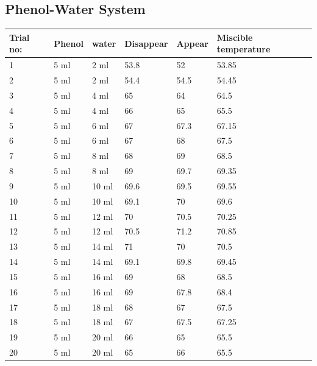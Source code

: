 \documentclass{report}
\begin{document}
 \subsection*{Phenol-Water System}
\begin{table}[H] 
    \centering
\begin{tabular}{|l|l|l|l|l|l|}
\hline
Trial no: & Phenol & water & Disappear & Appear & Miscible temperature  \\ \hline
1         & 5 ml   & 2 ml  & 53.8      & 52     & 53.85 \\ \hline
2         & 5 ml   & 2 ml  & 54.4      & 54.5   & 54.45 \\ \hline
3         & 5 ml   & 4 ml  & 65        & 64     & 64.5  \\ \hline
4         & 5 ml   & 4 ml  & 66        & 65     & 65.5  \\ \hline
5         & 5 ml   & 6 ml  & 67        & 67.3   & 67.15 \\ \hline
6         & 5 ml   & 6 ml  & 67        & 68     & 67.5  \\ \hline
7         & 5 ml   & 8 ml  & 68        & 69     & 68.5  \\ \hline
8         & 5 ml   & 8 ml  & 69        & 69.7   & 69.35 \\ \hline
9         & 5 ml   & 10 ml & 69.6      & 69.5   & 69.55 \\ \hline
10        & 5 ml   & 10 ml & 69.1      & 70     & 69.6  \\ \hline
11        & 5 ml   & 12 ml & 70        & 70.5   & 70.25 \\ \hline
12        & 5 ml   & 12 ml & 70.5      & 71.2   & 70.85 \\ \hline
13        & 5 ml   & 14 ml & 71        & 70     & 70.5  \\ \hline
14        & 5 ml   & 14 ml & 69.1      & 69.8   & 69.45 \\ \hline
15        & 5 ml   & 16 ml & 69        & 68     & 68.5  \\ \hline
16        & 5 ml   & 16 ml & 69        & 67.8   & 68.4  \\ \hline
17        & 5 ml   & 18 ml & 68        & 67     & 67.5  \\ \hline
18        & 5 ml   & 18 ml & 67        & 67.5   & 67.25 \\ \hline
19        & 5 ml   & 20 ml & 66        & 65     & 65.5  \\ \hline
20        & 5 ml   & 20 ml & 65        & 66     & 65.5  \\ \hline

\end{tabular}

\end{table}
\end{document}
